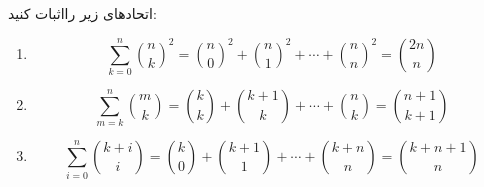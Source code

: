 \EXERCISE
اتحادهای زیر رااثبات کنید:
\begin{enumerate}
\item
$$\sum_{k=0}^{n} {\binom{n}{k}}^2 = {\binom{n}{0}}^2 + {\binom{n}{1}}^2 + \cdots + {\binom{n}{n}}^2 = \binom{2n}{n}$$
\item
$$\sum_{m=k}^{n} \binom{m}{k} = \binom{k}{k} + \binom{k + 1}{k} + \cdots + \binom{n}{k} = \binom{n + 1}{k + 1}$$
\item
$$\sum_{i=0}^{n} \binom{k + i}{i} = \binom{k}{0} + \binom{k + 1}{1} + \cdots + \binom{k + n}{n} = \binom{k + n + 1}{n}$$
\end{enumerate}